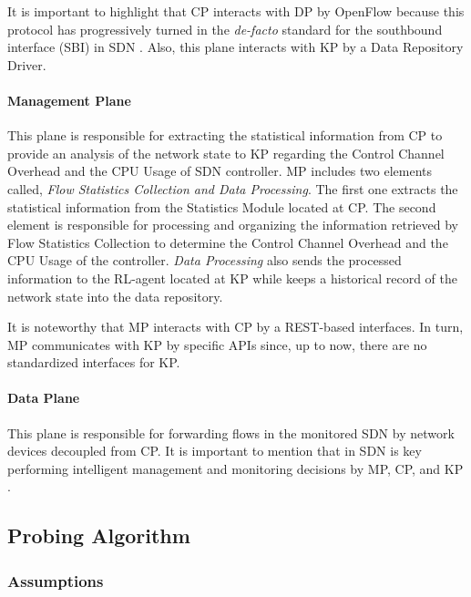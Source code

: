 It is important to highlight that CP interacts with DP by OpenFlow \cite{onf_2012:openflow} because this protocol has progressively turned in the \textit{de-facto} standard for the southbound interface (SBI) in SDN \cite{nunes_2014:survey_past_present_future}. Also, this plane interacts with KP by a Data Repository Driver.


\paragraph{\textbf{Management Plane}} 
This plane is responsible for extracting the statistical information from CP to provide an analysis of the network state to KP regarding the Control Channel Overhead and the CPU Usage of SDN controller. MP includes two elements called, \textit{Flow Statistics Collection and Data Processing}. The first one extracts the statistical information from the Statistics Module located at CP. The second element is responsible for processing and organizing the information retrieved by Flow Statistics Collection to determine the Control Channel Overhead and the CPU Usage of the controller. \textit{Data Processing} also sends the processed information to the RL-agent located at KP while keeps a historical record of the network state into the data repository.

It is noteworthy that MP interacts with CP by a REST-based interfaces. In turn, MP communicates with KP by specific APIs since, up to now, there are no standardized interfaces for KP.

\paragraph{\textbf{Data Plane}}
This plane is responsible for forwarding flows in the monitored SDN by network devices decoupled from CP. It is important to mention that in SDN is key performing intelligent management and monitoring decisions by MP, CP, and KP \cite{mestres_2017:KDN}\cite{kreutz_2015:sdn_comprehensive_survey}\cite{isolani_2015:interactive}.

\subsection{Probing Algorithm}
\label{subsec:ipro_algorithm}

\subsubsection{Assumptions}
\label{subsec:assumptions}

